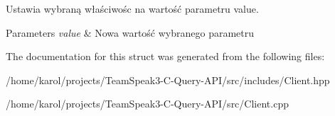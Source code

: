Ustawia wybraną właściwośc na wartość parametru value. 


\begin{DoxyParams}{Parameters}
{\em value} & Nowa wartość wybranego parametru \\
\hline
\end{DoxyParams}


The documentation for this struct was generated from the following files\+:\begin{DoxyCompactItemize}
\item 
/home/karol/projects/\+Team\+Speak3-\/\+C-\/\+Query-\/\+A\+P\+I/src/includes/Client.\+hpp\item 
/home/karol/projects/\+Team\+Speak3-\/\+C-\/\+Query-\/\+A\+P\+I/src/Client.\+cpp\end{DoxyCompactItemize}
